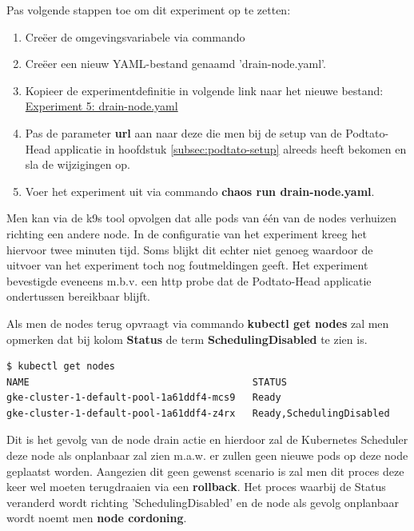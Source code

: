 Pas volgende stappen toe om dit experiment op te zetten: 
\begin{enumerate}
    \item Creëer de omgevingsvariabele via commando 
    \item Creëer een nieuw YAML-bestand genaamd 'drain-node.yaml'.
    \item Kopieer de experimentdefinitie in volgende link naar het nieuwe bestand: \href{https://github.com/KenBruggeman/BP\textunderscore 21-22/blob/master/bachelorproef/docs/chaostoolkit%20experimenten/drain-node.yaml}{Experiment 5: drain-node.yaml}
     \item Pas de parameter {\bf url} aan naar deze die men bij de setup van de Podtato-Head applicatie in hoofdstuk \ref{subsec:podtato-setup} alreeds heeft bekomen en sla de wijzigingen op.
     \item Voer het experiment uit via commando {\bf chaos run drain-node.yaml}.
\end{enumerate}

Men kan via de k9s tool opvolgen dat alle pods van één van de nodes verhuizen richting een andere node. In de configuratie van het experiment kreeg het hiervoor twee minuten tijd. Soms blijkt dit echter niet genoeg waardoor de uitvoer van het experiment toch nog foutmeldingen geeft. Het experiment bevestigde eveneens m.b.v. een http probe dat de Podtato-Head applicatie ondertussen bereikbaar blijft. 

Als men de nodes terug opvraagt via commando {\bf kubectl get nodes} zal men opmerken dat bij kolom {\bf Status} de term {\bf SchedulingDisabled} te zien is.

\begin{lstlisting}[language=bash]
$ kubectl get nodes
NAME                                       STATUS    
gke-cluster-1-default-pool-1a61ddf4-mcs9   Ready                      
gke-cluster-1-default-pool-1a61ddf4-z4rx   Ready,SchedulingDisabled

\end{lstlisting}

Dit is het gevolg van de node drain actie en hierdoor zal de Kubernetes Scheduler deze node als onplanbaar zal zien m.a.w. er zullen geen nieuwe pods op deze node geplaatst worden. Aangezien dit geen gewenst scenario is zal men dit proces deze keer wel moeten terugdraaien via een {\bf rollback}. 
Het proces waarbij de Status veranderd wordt richting 'SchedulingDisabled' en de node als gevolg onplanbaar wordt noemt men {\bf node cordoning}. \autocite{DeFabia2022}

